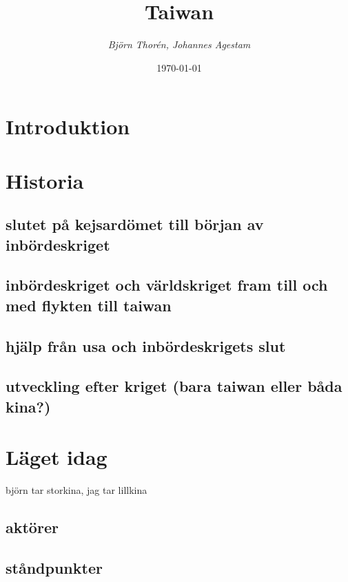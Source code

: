 \documentclass[a4paper,10pt]{article}
\title{\Huge\bf{Taiwan}\\}
\author{\emph{Björn Thorén, Johannes Agestam}}
\date{\today}
\begin{document}
\null  %
\nointerlineskip  %
\vfill
\let\snewpage \newpage
\let\newpage \relax
\maketitle
\let \newpage \snewpage
\vfill 
\break %

\newpage

\section{Introduktion}

\section{Historia}

\subsection{slutet på kejsardömet till början av inbördeskriget}

\subsection{inbördeskriget och världskriget fram till och med flykten till taiwan}

\subsection{hjälp från usa och inbördeskrigets slut}

\subsection{utveckling efter kriget (bara taiwan eller båda kina?)}


\section{Läget idag}

björn tar storkina, jag tar lillkina

\subsection{aktörer}

\subsection{ståndpunkter}
\end{document}
